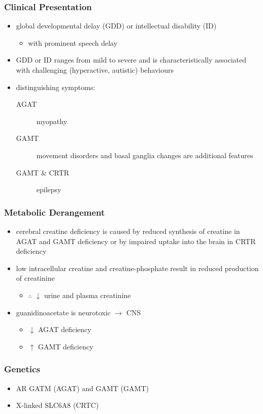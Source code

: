 \documentclass[12pt]{scrartcl}
\begin{document}
\subsubsection{Clinical Presentation}
\label{sec:org3c6d0a5}
\begin{itemize}
\item global developmental delay (GDD) or intellectual disability (ID)
\begin{itemize}
\item with prominent speech delay
\end{itemize}
\item GDD or ID ranges from mild to severe and is characteristically
associated with challenging (hyperactive, autistic) behaviours
\item distinguishing symptoms:
\begin{description}
\item[{AGAT}] myopathy
\item[{GAMT}] movement disorders and basal ganglia changes are
additional features
\item[{GAMT \& CRTR}] epilepsy
\end{description}
\end{itemize}

\subsubsection{Metabolic Derangement}
\label{sec:org43ed6ae}
\begin{itemize}
\item cerebral creatine deficiency is caused by reduced synthesis of
creatine in AGAT and GAMT deficiency or by impaired uptake into the
brain in CRTR deficiency
\item low intracellular creatine and creatine-phosphate result in reduced
production of creatinine
\begin{itemize}
\item \(\therefore\) \(\downarrow\) urine and plasma creatinine
\end{itemize}
\item guanidinoacetate is neurotoxic \(\to\) CNS
\begin{itemize}
\item \(\downarrow\) AGAT deficiency
\item \(\uparrow\) GAMT deficiency
\end{itemize}
\end{itemize}

\subsubsection{Genetics}
\label{sec:orgf74902f}
\begin{itemize}
\item AR GATM (AGAT)  and GAMT (GAMT)
\item X-linked SLC6A8 (CRTC)
\end{itemize}
\end{document}

